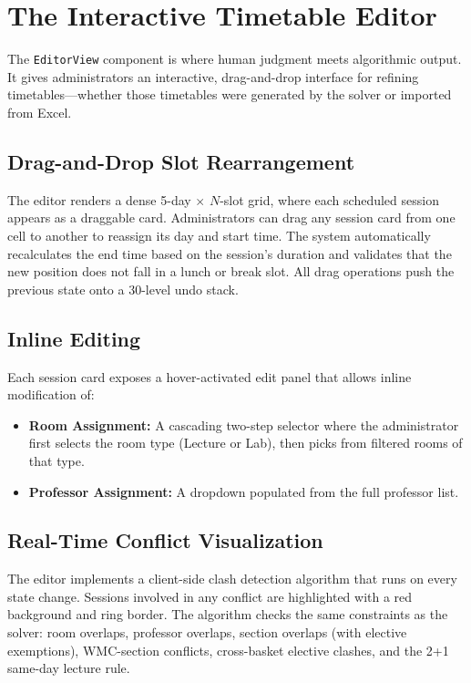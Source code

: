 \section{The Interactive Timetable Editor}
\label{sec:editor}

The \texttt{EditorView} component is where human judgment meets algorithmic output. It gives administrators an interactive, drag-and-drop interface for refining timetables---whether those timetables were generated by the solver or imported from Excel.

\subsection{Drag-and-Drop Slot Rearrangement}

The editor renders a dense 5-day $\times$ $N$-slot grid, where each scheduled session appears as a draggable card. Administrators can drag any session card from one cell to another to reassign its day and start time. The system automatically recalculates the end time based on the session's duration and validates that the new position does not fall in a lunch or break slot. All drag operations push the previous state onto a 30-level undo stack.

\subsection{Inline Editing}

Each session card exposes a hover-activated edit panel that allows inline modification of:
\begin{itemize}
    \item \textbf{Room Assignment:} A cascading two-step selector where the administrator first selects the room type (Lecture or Lab), then picks from filtered rooms of that type.
    \item \textbf{Professor Assignment:} A dropdown populated from the full professor list.
\end{itemize}

\subsection{Real-Time Conflict Visualization}

The editor implements a client-side clash detection algorithm that runs on every state change. Sessions involved in any conflict are highlighted with a red background and ring border. The algorithm checks the same constraints as the solver: room overlaps, professor overlaps, section overlaps (with elective exemptions), WMC-section conflicts, cross-basket elective clashes, and the 2+1 same-day lecture rule.

